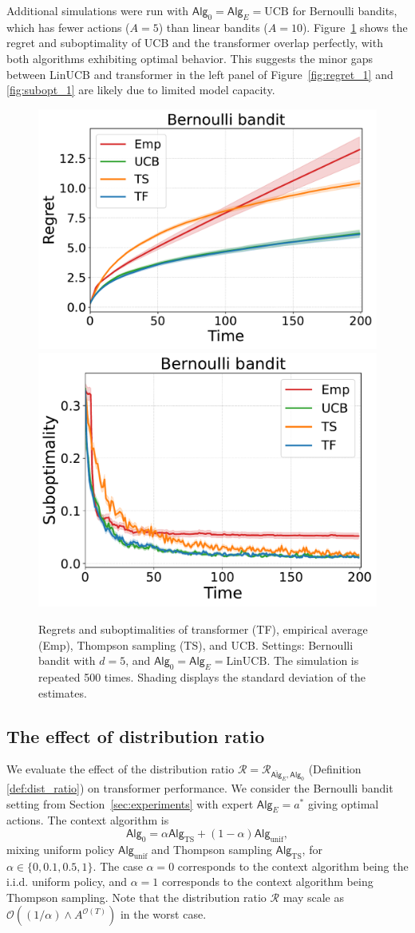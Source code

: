 \documentclass[10pt]{article}
\renewcommand{\cO}{\mathcal{O}}
\newcommand{\<}{\left\langle}
\renewcommand{\>}{\right\rangle}
\newcommand{\LinUCB}{{\mathrm{LinUCB}}}
\newcommand{\UCB}{{\mathrm{UCB}}}
\newcommand{\unif}{{\mathrm{unif}}}
\newcommand{\TS}{{\mathrm{TS}}}
\newcommand{\action}{{a}}
\newcommand{\totlen}{{T}} %
\newcommand{\sAlg}{{\mathsf{Alg}}}
\newcommand{\osAlg}{\overline{\mathsf{Alg}}}
\newcommand{\shortexp}{{E}}
\newcommand{\distratio}{{\mathcal{R}}}
\newcommand{\Numact}{{A}}
\begin{document}
Additional simulations were run with $\sAlg_0=\sAlg_{\shortexp}=\UCB$ for Bernoulli bandits, which has fewer actions ($\Numact=5$) than linear bandits ($\Numact=10$). Figure~\ref{fig:linucb_bernoulli} shows the regret and suboptimality of UCB and the transformer overlap perfectly, with both algorithms exhibiting optimal behavior. This suggests the minor gaps between LinUCB and transformer in the left panel of Figure~\ref{fig:regret_1} and \ref{fig:subopt_1} are likely due to limited model capacity. %

\begin{figure}[ht]
\centering  %
\includegraphics[width=0.47\linewidth]{Sections/figs/record_3_cum_True.pdf}
\includegraphics[width=0.45\linewidth]{Sections/figs/record_3_cum_False.pdf}
\caption{Regrets and suboptimalities of transformer (TF), empirical average (Emp), Thompson sampling (TS), and  UCB. Settings: Bernoulli bandit with $d=5$, and $\sAlg_0=\sAlg_\shortexp=\LinUCB$. 
The simulation is repeated 500 times. Shading displays the standard deviation of the estimates. } 
\label{fig:linucb_bernoulli} 
\end{figure}

\subsection{The effect of distribution ratio}

We evaluate the effect of the distribution ratio $\distratio=\distratio_{\osAlg_{\shortexp},\sAlg_0}$ (Definition \ref{def:dist_ratio}) on transformer performance. We consider the Bernoulli bandit setting from Section~\ref{sec:experiments} with expert $\sAlg_\shortexp=\action^*$ giving optimal actions. The context algorithm is $$\sAlg_0=\alpha\sAlg_{\TS}+(1-\alpha)\sAlg_{\unif},$$
mixing uniform policy $\sAlg_{\unif}$ and Thompson sampling $\sAlg_{\TS}$, for $\alpha\in\{0,0.1,0.5,1\}$. The case $\alpha=0$ corresponds to the context algorithm being the i.i.d. uniform policy, and  $\alpha=1$ corresponds to the context algorithm being Thompson sampling. Note that the distribution ratio $\distratio$ may scale as $\cO((1/\alpha)\wedge \Numact^{\cO(\totlen)})$ in the worst case. 
\end{document}
